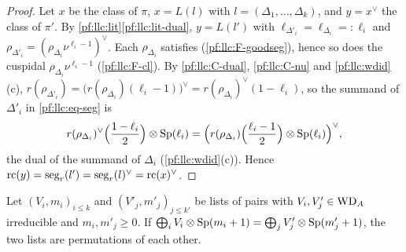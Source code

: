 \begin{proof}
Let $x$ be the class of $\pi$, $x=L(l)$ with $l=(\Delta_1,\dots,\Delta_k)$, and $y=x^\vee$ the class of $\pi'$. By
\cref{pf:llc:lit}\ref{pf:llc:lit-dual}, $y=L(l')$ with $\ell_{\Delta'_i}=\ell_{\Delta_i}=:\ell_i$ and
$\rho_{\Delta'_i}=(\rho_{\Delta_i}\nu^{\ell_i-1})^\vee$. Each $\rho_{\Delta_i}$ satisfies \llcGo{} (\ref{pf:llc:F-goodseg}), hence so does
the cuspidal $\rho_{\Delta_i}\nu^{\ell_i-1}$ (\ref{pf:llc:F-cl}). By \ref{pf:llc:C-dual}, \ref{pf:llc:C-nu} and \cref{pf:llc:wdid}(c),
$r(\rho_{\Delta'_i})=\bigl(r(\rho_{\Delta_i})(\ell_i-1)\bigr)^\vee=r(\rho_{\Delta_i})^\vee(1-\ell_i)$, so the summand of $\Delta'_i$ in
\eqref{pf:llc:eq-seg} is
\[
  r(\rho_{\Delta_i})^\vee\Bigl(\frac{1-\ell_i}2\Bigr)\otimes\operatorname{Sp}(\ell_i)=\Bigl(r(\rho_{\Delta_i})\Bigl(\frac{\ell_i-1}2\Bigr)\otimes
  \operatorname{Sp}(\ell_i)\Bigr)^\vee,
\]
the dual of the summand of $\Delta_i$ (\cref{pf:llc:wdid}(c)). Hence $\mathrm{rc}(y)=\operatorname{seg}_r(l')=\operatorname{seg}_r(l)^\vee=\mathrm{rc}(x)^\vee$.
\end{proof}

\begin{lemma}\label{pf:llc:spdec}
Let $(V_i,m_i)_{i\le k}$ and $(V'_j,m'_j)_{j\le k'}$ be lists of pairs with $V_i,V'_j\in\mathrm{WD}_A$ irreducible and $m_i,m'_j\ge0$. If
$\bigoplus_iV_i\otimes\operatorname{Sp}(m_i+1)=\bigoplus_jV'_j\otimes\operatorname{Sp}(m'_j+1)$, the two lists are permutations of each other.
\end{lemma}

